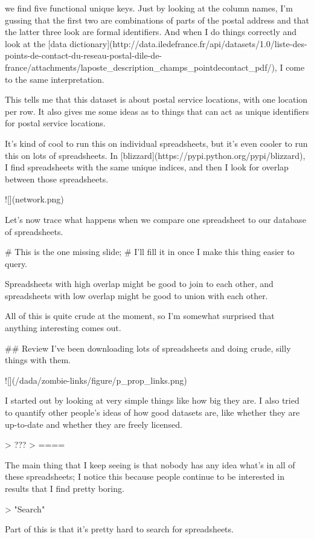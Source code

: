 \documentclass{acm_proc_article-sp}
\begin{document}
we find five functional unique keys. Just by looking at the column names,
I'm gussing that the first two are combinations of parts of the postal address
and that the latter three look are formal identifiers.
And when I do things correctly and look at the
[data dictionary](http://data.iledefrance.fr/api/datasets/1.0/liste-des-points-de-contact-du-reseau-postal-dile-de-france/attachments/laposte_description_champs_pointdecontact_pdf/),
I come to the same interpretation.

This tells me that this dataset is about postal service locations,
with one location per row. It also gives me some ideas as to things that can
act as unique identifiers for postal service locations.

It's kind of cool to run this on individual spreadsheets, but it's even cooler
to run this on lots of spreadsheets.
In [blizzard](https://pypi.python.org/pypi/blizzard), I find spreadsheets with
the same unique indices, and then I look for overlap between those spreadsheets.

![](network.png)

Let's now trace what happens when we compare one spreadsheet to our database
of spreadsheets.

    # This is the one missing slide;
    # I'll fill it in once I make this thing easier to query.

Spreadsheets with high overlap might be good to join to each other, and
spreadsheets with low overlap might be good to union with each other.

All of this is quite crude at the moment, so I'm somewhat surprised that
anything interesting comes out.

## Review
I've been downloading lots of spreadsheets and doing crude, silly things
with them.

![](/dada/zombie-links/figure/p_prop_links.png)

I started out by looking at very simple things like how big they are.
I also tried to quantify other people's ideas of how good datasets are,
like whether they are up-to-date and whether they are freely licensed.

> ???
> ====

The main thing that I keep seeing is that nobody has any idea what's in all
of these spreadsheets; I notice this because people continue to be interested
in results that I find pretty boring.

> "Search"

Part of this is that it's pretty hard to search for spreadsheets.
\end{document}
